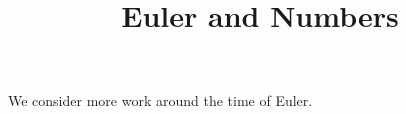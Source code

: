 \documentclass{ximera}
\title{Euler and Numbers}
\begin{document}
\begin{abstract}
\end{abstract}
\maketitle

We consider more work around the time of Euler.
\end{document}
